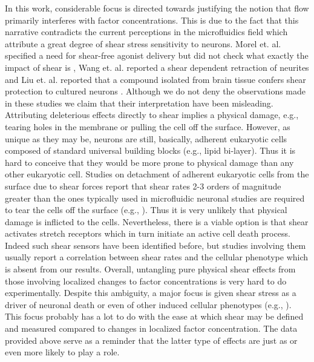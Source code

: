 In this work, considerable focus is directed towards justifying the notion that flow primarily interferes with factor concentrations. This is due to the fact that this narrative contradicts the current perceptions in the microfluidics field which attribute a great degree of shear stress sensitivity to neurons. Morel et. al. specified a need for shear-free agonist delivery but did not check what exactly the impact of shear is \cite{morel2012amplification}, Wang et. al. reported a shear dependent retraction of neurites \cite{wang2008microfluidics} and Liu et. al. reported that a compound isolated from brain tissue confers shear protection to cultured neurons \cite{liu2013galanin}. Although we do not deny the observations made in these studies we claim that their interpretation have been misleading. Attributing deleterious effects directly to shear implies a physical damage, e.g., tearing holes in the membrane or pulling the cell off the surface. However, as unique as they may be, neurons are still, basically, adherent eukaryotic cells composed of standard universal building blocks (e.g., lipid bi-layer). Thus it is hard to conceive that they would be more prone to physical damage than any other eukaryotic cell. Studies on detachment of adherent eukaryotic cells from the surface due to shear forces report that shear rates 2-3 orders of magnitude greater than the ones typically used in microfluidic neuronal studies are required to tear the cells off the surface (e.g., \cite{decave2002shear}). Thus it is very unlikely that physical damage is inflicted to the cells. Nevertheless, there is a viable option is that shear activates stretch receptors which in turn initiate an active cell death process. Indeed such shear sensors have been identified before, but studies involving them usually report a correlation between shear rates and the cellular phenotype \cite{toh2011fluid,shemesh2015flow} which is absent from our results. Overall, untangling pure physical shear effects from those involving localized changes to factor concentrations is very hard to do experimentally. Despite this ambiguity, a major focus is given shear stress as a driver of neuronal death or even of other induced cellular phenotypes (e.g., \cite{toh2011fluid}). This focus probably has a lot to do with the ease at which shear may be defined and measured compared to changes in localized factor concentration. The data provided above serve as a reminder that the latter type of effects are just as or even more likely to play a role.

